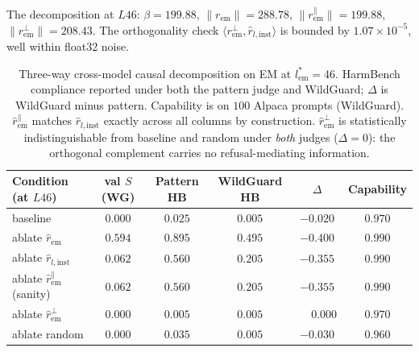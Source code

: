 The decomposition at $L46$: $\beta = 199.88$,
$\|r_{\text{em}}\| = 288.78$, $\|r_{\text{em}}^\parallel\| = 199.88$,
$\|r_{\text{em}}^\perp\| = 208.43$. The orthogonality check
$\langle r_{\text{em}}^\perp, \hat{r}_{l,\text{inst}}\rangle$ is
bounded by $1.07 \times 10^{-5}$, well within float32 noise.

\begin{table}[t]
\centering\small
\caption{Three-way cross-model causal decomposition on EM at
$l^*_{\text{em}} = 46$. HarmBench compliance reported under both the
pattern judge and WildGuard; $\Delta$ is WildGuard minus pattern.
Capability is on $100$ Alpaca prompts (WildGuard).
$\hat{r}_{\text{em}}^{\parallel}$ matches $\hat{r}_{l,\text{inst}}$
exactly across all columns by construction.
$\hat{r}_{\text{em}}^{\perp}$ is statistically indistinguishable
from baseline and random under \emph{both} judges
($\Delta = 0$): the orthogonal complement carries no
refusal-mediating information.}
\label{tab:p2-3way}
\begin{tabular}{l c c c c c}
\toprule
Condition (at $L46$)
                                   & val $S$ (WG)
                                                & Pattern HB
                                                          & WildGuard HB
                                                                       & $\Delta$
                                                                                  & Capability \\
\midrule
baseline                           & $0.000$    & $0.025$ & $0.005$    & $-0.020$ & $0.970$    \\
ablate $\hat{r}_{\text{em}}$       & $\mathbf{0.594}$
                                                & $0.895$ & $\mathbf{0.495}$
                                                                       & $\mathbf{-0.400}$
                                                                                  & $0.990$    \\
ablate $\hat{r}_{l,\text{inst}}$   & $0.062$    & $0.560$ & $0.205$    & $-0.355$ & $0.990$    \\
ablate $\hat{r}_{\text{em}}^{\parallel}$ (sanity)
                                   & $0.062$    & $0.560$ & $0.205$    & $-0.355$ & $0.990$    \\
ablate $\hat{r}_{\text{em}}^{\perp}$
                                   & $0.000$    & $\mathbf{0.005}$
                                                          & $\mathbf{0.005}$
                                                                       & $\mathbf{\phantom{-}0.000}$
                                                                                  & $0.970$    \\
ablate random                      & $0.000$    & $0.035$ & $0.005$    & $-0.030$ & $0.960$    \\
\bottomrule
\end{tabular}
\end{table}

